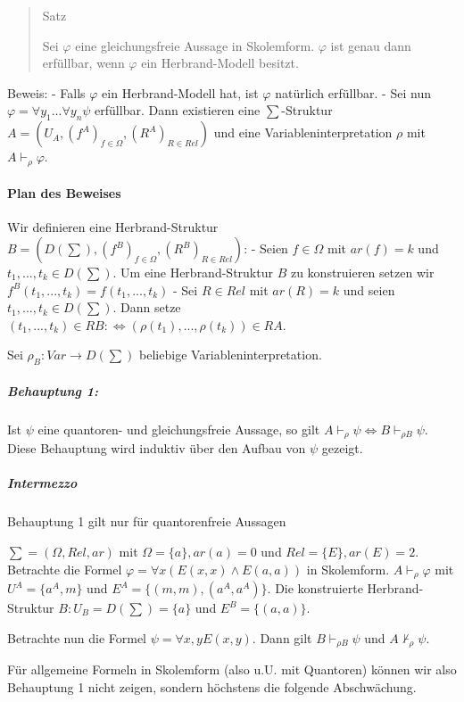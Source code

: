 \documentclass[a4paper]{article}
\begin{document}
\begin{multicols}{3}
  \begin{quote}
    Satz

    Sei $\varphi$ eine gleichungsfreie Aussage in Skolemform. $\varphi$ ist
    genau dann erfüllbar, wenn $\varphi$ ein Herbrand-Modell besitzt.
  \end{quote}

  Beweis: - Falls $\varphi$ ein Herbrand-Modell hat, ist $\varphi$
  natürlich erfüllbar. - Sei nun $\varphi=\forall y_1...\forall y_n\psi$
  erfüllbar. Dann existieren eine $\sum$-Struktur
  $A=(U_A,(f^A)_{f\in\Omega},(R^A)_{R\in Rel})$ und eine
  Variableninterpretation $\rho$ mit $A\vdash_\rho \varphi$.

  \paragraph{Plan des Beweises}\label{plan-des-beweises}

  Wir definieren eine Herbrand-Struktur
  $B=(D(\sum),(f^B)_{f\in\Omega},(R^B)_{R\in Rel})$: - Seien $f\in\Omega$
  mit $ar(f)=k$ und $t_1,...,t_k\in D(\sum)$. Um eine Herbrand-Struktur
  $B$ zu konstruieren setzen wir $f^B(t_1,...,t_k) =f(t_1,...,t_k)$ - Sei
  $R\in Rel$ mit $ar(R)=k$ und seien $t_1,...,t_k\in D(\sum)$. Dann setze
  $(t_1,...,t_k)\in RB:\Leftrightarrow (\rho(t_1),...,\rho(t_k))\in RA$.

  Sei $\rho_B:Var \rightarrow D(\sum)$ beliebige Variableninterpretation.

  \subparagraph{Behauptung 1:}\label{behauptung-1}

  Ist $\psi$ eine quantoren- und gleichungsfreie Aussage, so gilt
  $A\vdash_{\rho}\psi \Leftrightarrow B\vdash_{\rho B} \psi$. Diese
  Behauptung wird induktiv über den Aufbau von $\psi$ gezeigt.

  \subparagraph{Intermezzo}\label{intermezzo}

  Behauptung 1 gilt nur für quantorenfreie Aussagen

  $\sum = (\Omega,Rel,ar)$ mit $\Omega =\{a\},ar(a) =0$ und
  $Rel=\{E\},ar(E) =2$. Betrachte die Formel
  $\varphi=\forall x(E(x,x)\wedge E(a,a))$ in Skolemform.
  $A\vdash_\rho \varphi$ mit $U^A=\{a^A,m\}$ und
  $E^A=\{(m,m),(a^A,a^A)\}$. Die konstruierte Herbrand-Struktur
  $B:U_B=D(\sum) =\{a\}$ und $E^B=\{(a,a)\}$.

  Betrachte nun die Formel $\psi=\forall x,y E(x,y)$. Dann gilt
  $B\vdash_{\rho B}\psi$ und $A\not\vdash_\rho \psi$.

  Für allgemeine Formeln in Skolemform (also u.U. mit Quantoren) können
  wir also Behauptung 1 nicht zeigen, sondern höchstens die folgende
  Abschwächung.


\end{multicols}
\end{document}
